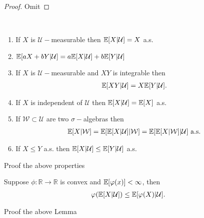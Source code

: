 \begin{proof}
 Omit 
\end{proof}
\begin{theorem}\hspace{1mm}\\
	
 \begin{enumerate}
   \item If $X$ is $\mathcal{U}-$measurable then $\mathbb{E}[X|\mathcal{U}] = X$ a.s.
   \item $\mathbb{E}[aX + bY|\mathcal{U}] = a\mathbb{E}[X|\mathcal{U}] + b \mathbb{E}[Y|\mathcal{U}]$
   \item If $X$ is $\mathcal{U}-$measurable and $XY$ is integrable then 
     \begin{align*}
       \mathbb{E}[XY|\mathcal{U}] = X \mathbb{E}[Y|\mathcal{U}]
     .\end{align*}
   \item If $X$ is independent of $\mathcal{U}$ then $\mathbb{E}[X|\mathcal{U}] = \mathbb{E}[X]$ a.s.
   \item If $\mathcal{W} \subset  \mathcal{U}$ are two $\sigma-$algebras then 
     \begin{align*}
       \mathbb{E}[X|\mathcal{W}] = \mathbb{E}[\mathbb{E}[X|\mathcal{U}]|\mathcal{W}] = \mathbb{E}[\mathbb{E}[X|\mathcal{W}]|\mathcal{U}] \text{ a.s.}
     \end{align*}
   \item If $X\le Y$ a.s. then $\mathbb{E}[X|\mathcal{U}] \le \mathbb{E}[Y|\mathcal{U}]$  a.s.
 \end{enumerate} 
\end{theorem}
\begin{exercise}
 Proof the above properties  
\end{exercise}
\begin{lemma}
  Suppose $\phi  : \mathbb{R}\to \mathbb{R}$ is convex and $\mathbb{E}[\varphi(x)] < \infty$, then
  \begin{align*}
    \varphi(\mathbb{E}[X|\mathcal{U}]) \le \mathbb{E}[\varphi(X)|\mathcal{U}]
  .\end{align*} 
\end{lemma}
\begin{exercise}
 Proof the above Lemma 
\end{exercise}
